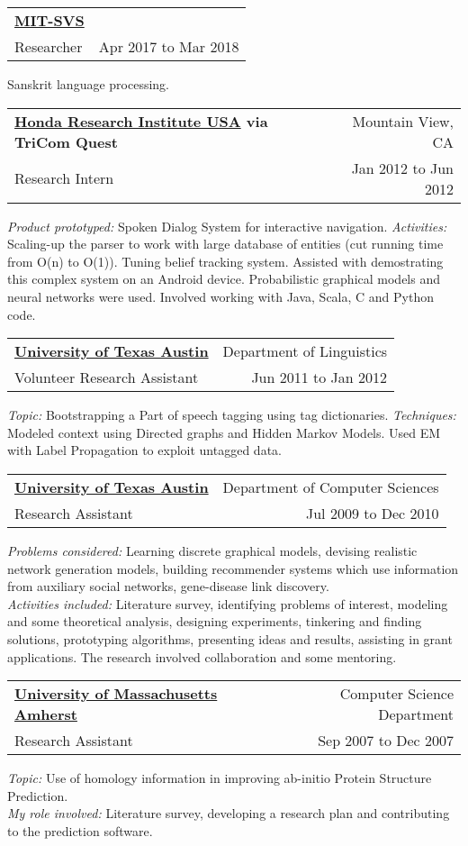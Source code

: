 \documentclass[biblist]{article}
\makeatletter
\newcommand{\resheading}[4]{
\begin{tabular*}{\columnwidth}{@{}l@{\extracolsep{\fill}}r@{}}
\textbf{#1} & #2 \\
#3 & #4 \\
\end{tabular*}}
\makeatother
\begin{document}
\resheading{\href{}{MIT-SVS}}
{}
{Researcher}
{Apr 2017 to Mar 2018}
Sanskrit language processing.

\resheading{\href{http://www.honda-ri.com/HRI_Us/}{Honda Research Institute USA} via TriCom Quest}
{Mountain View, CA}
{Research Intern}
{Jan 2012 to Jun 2012}
\textit{Product prototyped:} Spoken Dialog System for interactive navigation.
\textit{Activities:} Scaling-up the parser to work with large database of entities (cut running time from O(n) to O(1)).
Tuning belief tracking system. Assisted with demostrating this complex system on an Android device. Probabilistic graphical models and neural networks were used. Involved working with Java, Scala, C and Python code.

\resheading{\href{http://www.cs.utexas.edu}{University of Texas Austin}}
{Department of Linguistics}
{Volunteer Research Assistant}
{Jun 2011 to Jan 2012}
\textit{Topic:} Bootstrapping a Part of speech tagging using tag dictionaries.
\textit{Techniques:} Modeled context using Directed graphs and Hidden Markov Models. Used EM with Label Propagation to exploit untagged data.

\resheading{\href{http://www.cs.utexas.edu}{University of Texas Austin}}
{Department of Computer Sciences}
{Research Assistant}
{Jul 2009 to Dec 2010}
\textit{Problems considered:} Learning discrete graphical models, devising realistic network generation models, building recommender systems which use information from auxiliary social networks, gene-disease link discovery. \\
\textit{Activities included:} Literature survey, identifying problems of interest, modeling and some theoretical analysis, designing experiments, tinkering and finding solutions, prototyping algorithms, presenting ideas and results, assisting in grant applications. The research involved collaboration and some mentoring.



\resheading{\href{http://cs.umass.edu}{University of Massachusetts Amherst}}
{Computer Science Department}
{Research Assistant}
{Sep 2007 to Dec 2007}
\textit{Topic:} Use of homology information in improving ab-initio Protein Structure Prediction. \\
\textit{My role involved:} Literature survey, developing a research plan and contributing to the prediction software.
\end{document}
